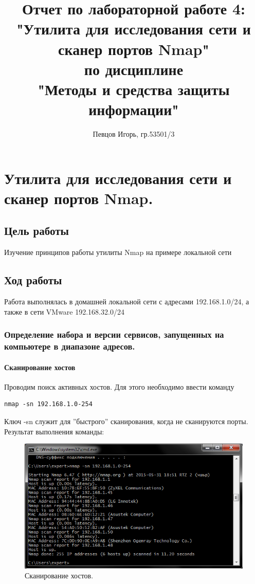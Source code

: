 \documentclass[a4paper, 14pt]{article}				%
\author{Певцов Игорь, гр.53501/3}
\title{Отчет по лабораторной работе 4:\\"Утилита для исследования сети и сканер портов Nmap"\\ по дисциплине\\"Методы и средства защиты информации"}
\begin{document}
\maketitle

\newpage
\tableofcontents{}

\newpage
\section{Утилита для исследования сети и сканер портов Nmap.}

\subsection{Цель работы}
Изучение принципов работы утилиты Nmap на примере локальной сети
\subsection{Ход работы}

Работа выполнялась в домашней локальной сети с адресами 192.168.1.0/24, а также в сети VMware 192.168.32.0/24

\subsubsection{Определение набора и версии сервисов, запущенных на компьютере в диапазоне адресов.}
\paragraph{Сканирование хостов\\}

Проводим поиск активных хостов. Для этого необходимо ввести команду
\begin{Verbatim}[frame=single]
	nmap -sn 192.168.1.0-254
\end{Verbatim}
Ключ -sn служит для ''быстрого'' сканирования, когда не сканируются порты.
Результат выполнения команды:
\begin{figure}[h!]
\centering
\includegraphics[width=\textwidth]{rsrc/nmap_1}
\caption{Сканирование хостов.}
\end{figure}
\end{document}
